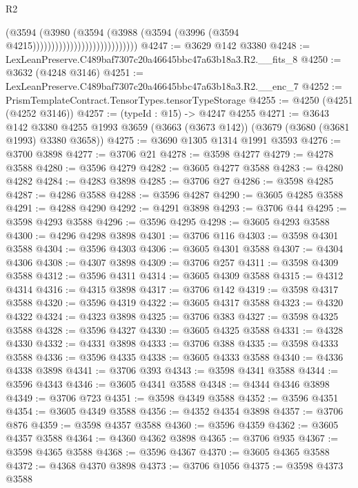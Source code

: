 \begin{lexlean}{R2}
\begin{coremodule}
                                              (@3594
                                                (@3980
                                                  (@3594
                                                    (@3988
                                                      (@3594
                                                        (@3996
                                                          (@3594 @4215))))))))))))))))))))))))))))
@4247 := @3629 @142 @3380
@4248 := LexLeanPreserve.C489baf7307c20a46645bbc47a63b18a3.R2.__fits_8
@4250 := @3632 (@4248 @3146)
@4251 := LexLeanPreserve.C489baf7307c20a46645bbc47a63b18a3.R2.__enc_7
@4252 := PrismTemplateContract.TensorTypes.tensorTypeStorage
@4255 := @4250 (@4251 (@4252 @3146))
@4257 := (typeId : @15) -> @4247 @4255
@4271 := @3643
    @142
    @3380
    @4255
    @1993
    @3659
    (@3663 (@3673 @142))
    (@3679 (@3680 (@3681 @1993) @3380 @3658))
@4275 := @3690 @1305 @1314 @1991 @3593
@4276 := @3700 @3898
@4277 := @3706 @21
@4278 := @3598 @4277
@4279 := @4278 @3588
@4280 := @3596 @4279
@4282 := @3605 @4277 @3588
@4283 := @4280 @4282
@4284 := @4283 @3898
@4285 := @3706 @27
@4286 := @3598 @4285
@4287 := @4286 @3588
@4288 := @3596 @4287
@4290 := @3605 @4285 @3588
@4291 := @4288 @4290
@4292 := @4291 @3898
@4293 := @3706 @44
@4295 := @3598 @4293 @3588
@4296 := @3596 @4295
@4298 := @3605 @4293 @3588
@4300 := @4296 @4298 @3898
@4301 := @3706 @116
@4303 := @3598 @4301 @3588
@4304 := @3596 @4303
@4306 := @3605 @4301 @3588
@4307 := @4304 @4306
@4308 := @4307 @3898
@4309 := @3706 @257
@4311 := @3598 @4309 @3588
@4312 := @3596 @4311
@4314 := @3605 @4309 @3588
@4315 := @4312 @4314
@4316 := @4315 @3898
@4317 := @3706 @142
@4319 := @3598 @4317 @3588
@4320 := @3596 @4319
@4322 := @3605 @4317 @3588
@4323 := @4320 @4322
@4324 := @4323 @3898
@4325 := @3706 @383
@4327 := @3598 @4325 @3588
@4328 := @3596 @4327
@4330 := @3605 @4325 @3588
@4331 := @4328 @4330
@4332 := @4331 @3898
@4333 := @3706 @388
@4335 := @3598 @4333 @3588
@4336 := @3596 @4335
@4338 := @3605 @4333 @3588
@4340 := @4336 @4338 @3898
@4341 := @3706 @393
@4343 := @3598 @4341 @3588
@4344 := @3596 @4343
@4346 := @3605 @4341 @3588
@4348 := @4344 @4346 @3898
@4349 := @3706 @723
@4351 := @3598 @4349 @3588
@4352 := @3596 @4351
@4354 := @3605 @4349 @3588
@4356 := @4352 @4354 @3898
@4357 := @3706 @876
@4359 := @3598 @4357 @3588
@4360 := @3596 @4359
@4362 := @3605 @4357 @3588
@4364 := @4360 @4362 @3898
@4365 := @3706 @935
@4367 := @3598 @4365 @3588
@4368 := @3596 @4367
@4370 := @3605 @4365 @3588
@4372 := @4368 @4370 @3898
@4373 := @3706 @1056
@4375 := @3598 @4373 @3588

\end{coremodule}
\end{lexlean}
